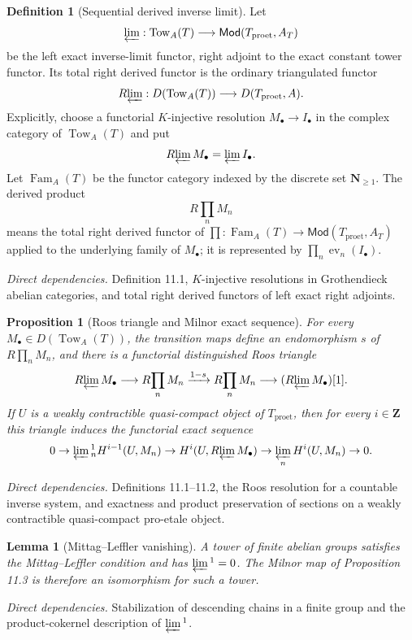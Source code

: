 \documentclass[10pt]{article}
\newtheorem{proposition}[theorem]{Proposition}
\newtheorem{lemma}[theorem]{Lemma}
\theoremstyle{definition}
\newtheorem{definition}[theorem]{Definition}
\newcommand{\Mod}{\mathsf{Mod}}
\newcommand{\Rlim}{R\!\varprojlim}
\newcommand{\Proet}{\mathrm{proet}}
\newcommand{\deps}[1]{\par\smallskip\textit{Direct dependencies.} #1\par}
\begin{document}
\begin{definition}[Sequential derived inverse limit]
Let
\[
 \varprojlim:\operatorname{Tow}_{A}(T)
 \longrightarrow\Mod(T_{\Proet},A_T)
\]
be the left exact inverse-limit functor, right adjoint to the exact constant
tower functor.  Its total right derived functor is the ordinary
triangulated functor
\[
 \Rlim:D(\operatorname{Tow}_{A}(T))
 \longrightarrow D(T_{\Proet},A).
\]
Explicitly, choose a functorial $K$-injective resolution
$M_\bullet\to I_\bullet$ in the complex category of
$\operatorname{Tow}_{A}(T)$ and put
\[
 \Rlim M_\bullet=\varprojlim I_\bullet.
\]
Let $\operatorname{Fam}_{A}(T)$ be the functor category indexed by the
discrete set $\mathbf N_{\geq1}$.  The derived product
\[
 R\!\prod_nM_n
\]
means the total right derived functor of
$\prod:\operatorname{Fam}_{A}(T)\to\Mod(T_{\Proet},A_T)$ applied to the
underlying family of $M_\bullet$; it is represented by
$\prod_n\operatorname{ev}_n(I_\bullet)$.
\end{definition}
\deps{Definition 11.1, $K$-injective resolutions in Grothendieck abelian
categories, and total right derived functors of left exact right adjoints.}

\begin{proposition}[Roos triangle and Milnor exact sequence]
For every $M_\bullet\in D(\operatorname{Tow}_{A}(T))$, the transition maps
define an endomorphism $s$ of $R\!\prod_nM_n$, and there is a functorial
distinguished Roos triangle
\[
 \Rlim M_\bullet\longrightarrow R\!\prod_nM_n
 \xrightarrow{1-s}R\!\prod_nM_n
 \longrightarrow(\Rlim M_\bullet)[1].
\]
If $U$ is a weakly contractible quasi-compact object of $T_{\Proet}$, then
for every $i\in\mathbf Z$ this triangle induces the functorial exact
sequence
\[
 0\to\varprojlim{}^1_nH^{i-1}(U,M_n)
 \to H^i(U,\Rlim M_\bullet)
 \to\varprojlim_nH^i(U,M_n)\to0.
\]
\end{proposition}
\deps{Definitions 11.1--11.2, the Roos resolution for a countable inverse
system, and exactness and product preservation of sections on a weakly
contractible quasi-compact pro-etale object.}

\begin{lemma}[Mittag--Leffler vanishing]
A tower of finite abelian groups satisfies the Mittag--Leffler condition
and has $\varprojlim{}^1=0$.  The Milnor map of Proposition 11.3 is
therefore an isomorphism for such a tower.
\end{lemma}
\deps{Stabilization of descending chains in a finite group and the
product-cokernel description of $\varprojlim{}^1$.}
\end{document}

